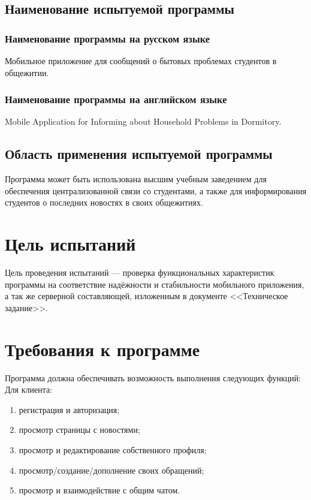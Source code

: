 \documentclass{../includes/TechDoc}
\begin{document}
    \subsection{Наименование испытуемой программы}

    \subsubsection{Наименование программы на русском языке}

    Мобильное приложение для сообщений о бытовых проблемах студентов в общежитии.

    \subsubsection{Наименование программы на английском языке}

    Mobile Application for Informing about Household Problems in Dormitory.

    \subsection{Область применения испытуемой программы}

    Программа может быть использована высшим учебным заведением для обеспечения централизованной связи со студентами, а
    также для информирования студентов о последних новостях в своих общежитиях.


    \section{Цель испытаний}

    Цель проведения испытаний — проверка функциональных характеристик программы на соответствие надёжности и стабильности
    мобильного приложения, а так же серверной составляющей, изложенным в документе <<Техническое задание>>.


    \section{Требования к программе}

    Программа должна обеспечивать возможность выполнения следующих функций:\\

    Для клиента:
    \begin{enumerate}[noitemsep]
        \item регистрация и авторизация;
        \item просмотр страницы с новостями;
        \item просмотр и редактирование собственного профиля;
        \item просмотр/создание/дополнение своих обращений;
        \item просмотр и взаимодействие с общим чатом.
    \end{enumerate}
\end{document}
